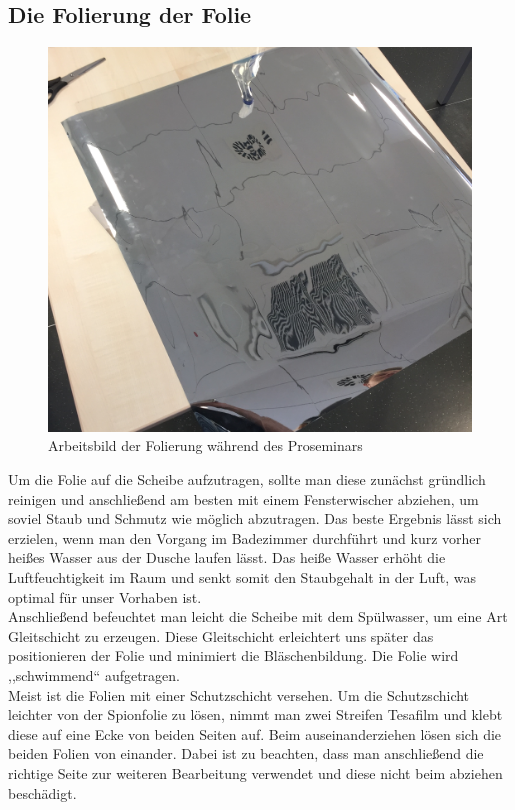 \subsection{Die Folierung der Folie}
\begin{figure}
	\vspace{-20pt}
	\begin{center}
		\includegraphics[scale=0.07]{bilder/spionspiegel.jpg}
	\end{center}
	\caption{Arbeitsbild der Folierung während des Proseminars}
	\vspace{-10pt}
\end{figure}
Um die Folie auf die Scheibe aufzutragen, sollte man diese zunächst gründlich reinigen und anschließend am besten mit einem Fensterwischer abziehen, um soviel Staub und Schmutz wie möglich abzutragen. Das beste Ergebnis lässt sich erzielen, wenn man den Vorgang im Badezimmer durchführt und kurz vorher heißes Wasser aus der Dusche laufen lässt. Das heiße Wasser erhöht die Luftfeuchtigkeit im Raum und senkt somit den Staubgehalt in der Luft, was optimal für unser Vorhaben ist. \\
Anschließend befeuchtet man leicht die Scheibe mit dem Spülwasser, um eine Art Gleitschicht zu erzeugen. Diese Gleitschicht erleichtert uns später das positionieren der Folie und minimiert die Bläschenbildung. Die Folie wird ,,schwimmend`` aufgetragen. \\
Meist ist die Folien mit einer Schutzschicht versehen. Um die Schutzschicht leichter von der Spionfolie zu lösen, nimmt man zwei Streifen Tesafilm und klebt diese auf eine Ecke von beiden Seiten auf. Beim auseinanderziehen lösen sich die beiden Folien von einander. Dabei ist zu beachten, dass man anschließend die richtige Seite zur weiteren Bearbeitung verwendet und diese nicht beim abziehen beschädigt. \\
